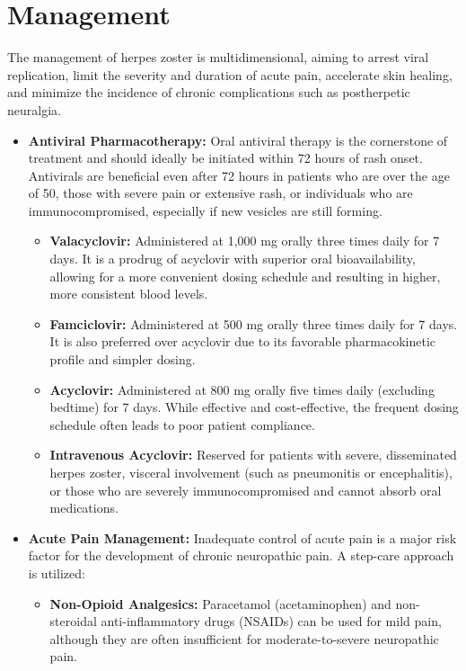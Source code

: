 \section*{Management}
The management of herpes zoster is multidimensional, aiming to arrest viral replication, limit the severity and duration of acute pain, accelerate skin healing, and minimize the incidence of chronic complications such as postherpetic neuralgia.

\begin{itemize}
    \item \textbf{Antiviral Pharmacotherapy:} Oral antiviral therapy is the cornerstone of treatment and should ideally be initiated within 72 hours of rash onset. Antivirals are beneficial even after 72 hours in patients who are over the age of 50, those with severe pain or extensive rash, or individuals who are immunocompromised, especially if new vesicles are still forming.
    \begin{itemize}
        \item \textbf{Valacyclovir:} Administered at 1,000 mg orally three times daily for 7 days. It is a prodrug of acyclovir with superior oral bioavailability, allowing for a more convenient dosing schedule and resulting in higher, more consistent blood levels.
        \item \textbf{Famciclovir:} Administered at 500 mg orally three times daily for 7 days. It is also preferred over acyclovir due to its favorable pharmacokinetic profile and simpler dosing.
        \item \textbf{Acyclovir:} Administered at 800 mg orally five times daily (excluding bedtime) for 7 days. While effective and cost-effective, the frequent dosing schedule often leads to poor patient compliance.
        \item \textbf{Intravenous Acyclovir:} Reserved for patients with severe, disseminated herpes zoster, visceral involvement (such as pneumonitis or encephalitis), or those who are severely immunocompromised and cannot absorb oral medications.
    \end{itemize}
    \item \textbf{Acute Pain Management:} Inadequate control of acute pain is a major risk factor for the development of chronic neuropathic pain. A step-care approach is utilized:
    \begin{itemize}
        \item \textbf{Non-Opioid Analgesics:} Paracetamol (acetaminophen) and non-steroidal anti-inflammatory drugs (NSAIDs) can be used for mild pain, although they are often insufficient for moderate-to-severe neuropathic pain.

\end{itemize}
\end{itemize}

